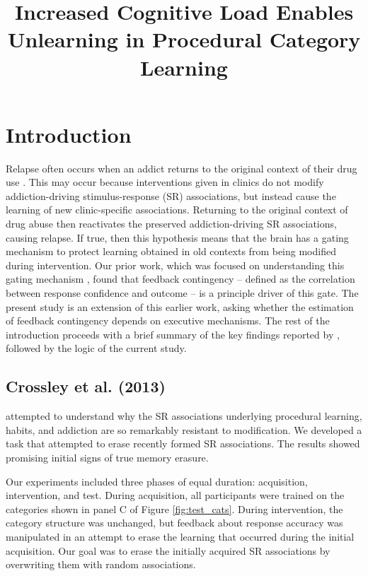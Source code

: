 \documentclass[apacite,draftfirst,jou]{apa6}
\title{Increased Cognitive Load Enables Unlearning in Procedural Category Learning}
\begin{document}
\maketitle

\section*{Introduction}
Relapse often occurs when an addict returns to the original context of their
drug use \cite{higgins_outpatient_1995}. This may occur because interventions
given in clinics do not modify addiction-driving stimulus-response (SR)
associations, but instead cause the learning of new clinic-specific
associations. Returning to the original context of drug abuse then reactivates
the preserved addiction-driving SR associations, causing relapse. If true, then
this hypothesis means that the brain has a gating mechanism to protect learning
obtained in old contexts from being modified during intervention. Our prior
work, which was focused on understanding this gating mechanism
\cite{crossley_erasing_2013}, found that feedback contingency -- defined as the
correlation between response confidence and outcome -- is a principle driver of
this gate. The present study is an extension of this earlier work, asking
whether the estimation of feedback contingency depends on executive mechanisms.
The rest of the introduction proceeds with a brief summary of the key findings
reported by \cite{crossley_erasing_2013}, followed by the logic of the current
study.

\subsection*{Crossley et al. (2013)}
 attempted to understand why the SR associations
underlying procedural learning, habits, and addiction are so remarkably
resistant to modification. We developed a task that attempted to erase recently
formed SR associations. The results showed promising initial signs of true
memory erasure.

Our experiments included three phases of equal duration: acquisition,
intervention, and test. During acquisition, all participants were trained on the
categories shown in panel C of Figure \ref{fig:test_cats}. During intervention,
the category structure was unchanged, but feedback about response accuracy was
manipulated in an attempt to erase the learning that occurred during the initial
acquisition. Our goal was to erase the initially acquired SR associations by
overwriting them with random associations.
\end{document}
